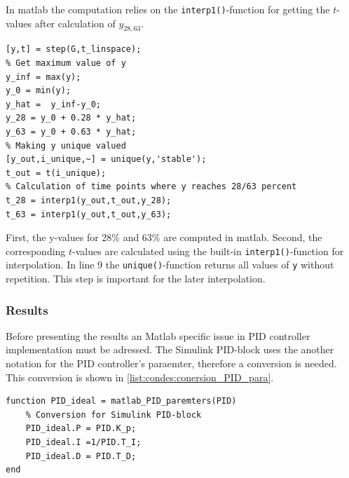 In matlab the computation relies on the \texttt{interp1()}-function for getting the $t$-values after calculation of $y_{28,63}$.

\begin{lstlisting}[style=Matlab-editor,caption={This code snippet shows the general way of calculating $t_{28}$ and $t_{63}$.},captionpos=b,label={list:condes:maxS}]
[y,t] = step(G,t_linspace);
% Get maximum value of y
y_inf = max(y);
y_0 = min(y);
y_hat =  y_inf-y_0;
y_28 = y_0 + 0.28 * y_hat;
y_63 = y_0 + 0.63 * y_hat;
% Making y unique valued
[y_out,i_unique,~] = unique(y,'stable');
t_out = t(i_unique);
% Calculation of time points where y reaches 28/63 percent
t_28 = interp1(y_out,t_out,y_28);
t_63 = interp1(y_out,t_out,y_63);
\end{lstlisting}

First, the y-values for 28\% and 63\% are computed in matlab.
Second, the corresponding $t$-values are calculated using the built-in \texttt{interp1()}-function for interpolation.
In line 9 the \texttt{unique()}-function returns all values of \texttt{y} without repetition.
This step is important for the later interpolation.


\subsubsection{Results} \label{sec:condes:ZN:results}

Before presenting the results an Matlab specific issue in PID controller implementation must be adressed.
The Simulink PID-block uses the another notation for the PID controller's paraemter, therefore a conversion is needed. 
This conversion is shown in \autoref{list:condes:conersion_PID_para}.


\begin{lstlisting}[style=Matlab-editor,caption={Conversion of the parameters calculated by the previously mentioned algorithms and the values required for Simulink PID block in Matlab.},captionpos=b,label={list:condes:conersion_PID_para}]
function PID_ideal = matlab_PID_paremters(PID)
    % Conversion for Simulink PID-block
    PID_ideal.P = PID.K_p;
    PID_ideal.I =1/PID.T_I;
    PID_ideal.D = PID.T_D;
end
\end{lstlisting}


